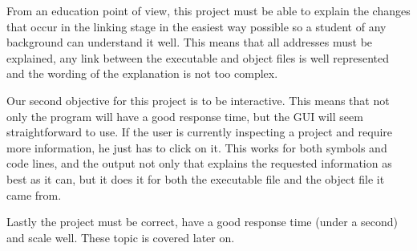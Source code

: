 From an education point of view, this project must be able to explain the changes that occur in the linking stage in the easiest way possible so a student of any background can understand it well. This means that all addresses must be explained, any link between the executable and object files is well represented and the wording of the explanation is not too complex.

Our second objective for this project is to be interactive. This means that not only the program will have a good response time, but the GUI will seem straightforward to use. If the user is currently inspecting a project and require more information, he just has to click on it. This works for both symbols and code lines, and the output not only that explains the requested information as best as it can, but it does it for both the executable file and the object file it came from.

Lastly the project must be correct, have a good response time (under a second) and scale well. These topic is covered later on.
